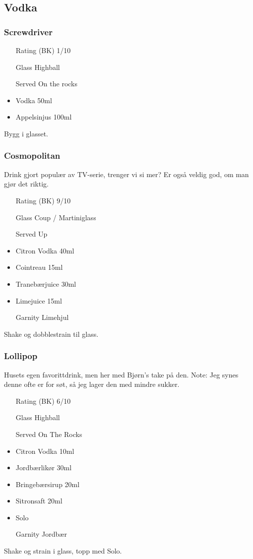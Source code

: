 \subsection{Vodka}
\subsubsection{Screwdriver}
\begin{itemize}
    \item[Rating (BK)] 1/10
    \item[Glass] Highball
    \item[Served] On the rocks
    \item Vodka 50ml
    \item Appelsinjus 100ml
\end{itemize}
Bygg i glasset.

\subsubsection{Cosmopolitan}
Drink gjort populær av TV-serie, trenger vi si mer? Er også veldig god, om man gjør det riktig.
\begin{itemize}
    \item[Rating (BK)] 9/10
    \item[Glass] Coup / Martiniglass
    \item[Served] Up
    \item Citron Vodka 40ml
    \item Cointreau 15ml
    \item Tranebærjuice 30ml
    \item Limejuice 15ml
    \item[Garnity] Limehjul
\end{itemize}
Shake og dobblestrain til glass.

\subsubsection{Lollipop}
Husets egen favorittdrink, men her med Bjørn's take på den. Note: Jeg synes denne ofte er for søt, så jeg lager den med mindre sukker. 
\begin{itemize}
    \item[Rating (BK)] 6/10
    \item[Glass] Highball
    \item[Served] On The Rocks
    \item Citron Vodka 10ml
    \item Jordbærlikør 30ml
    \item Bringebærsirup 20ml 
    \item Sitronsaft 20ml
    \item Solo
    \item[Garnity] Jordbær
\end{itemize}
Shake og strain i glass, topp med Solo.

